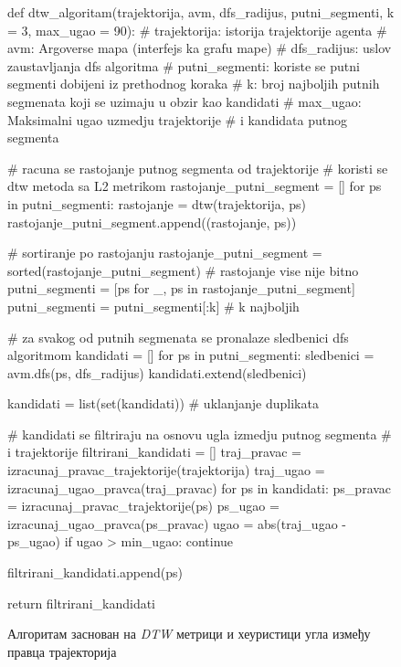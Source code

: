 \documentclass[11pt,oneside]{memoir}
\begin{document}
\begin{figure}
  \begin{python}
  def dtw_algoritam(trajektorija, avm, dfs_radijus, putni_segmenti, 
      k = 3, max_ugao = 90):
    # trajektorija: istorija trajektorije agenta 
    # avm: Argoverse mapa (interfejs ka grafu mape)
    # dfs_radijus: uslov zaustavljanja dfs algoritma
    # putni_segmenti: koriste se putni segmenti dobijeni iz prethodnog koraka
    # k: broj najboljih putnih segmenata koji se uzimaju u obzir kao kandidati
    # max_ugao: Maksimalni ugao uzmedju trajektorije 
    #           i kandidata putnog segmenta
    
    # racuna se rastojanje putnog segmenta od trajektorije
    # koristi se dtw metoda sa L2 metrikom
    rastojanje_putni_segment = []
    for ps in putni_segmenti:
      rastojanje = dtw(trajektorija, ps)
      rastojanje_putni_segment.append((rastojanje, ps))

    # sortiranje po rastojanju
    rastojanje_putni_segment = sorted(rastojanje_putni_segment)
    # rastojanje vise nije bitno
    putni_segmenti = [ps for _, ps in rastojanje_putni_segment]
    putni_segmenti = putni_segmenti[:k]  # k najboljih

    # za svakog od putnih segmenata se pronalaze sledbenici dfs algoritmom
    kandidati = []
    for ps in putni_segmenti:
      sledbenici = avm.dfs(ps, dfs_radijus)
      kandidati.extend(sledbenici)

    kandidati = list(set(kandidati))  # uklanjanje duplikata

    # kandidati se filtriraju na osnovu ugla izmedju putnog segmenta
    # i trajektorije
    filtrirani_kandidati = []
    traj_pravac = izracunaj_pravac_trajektorije(trajektorija)
    traj_ugao = izracunaj_ugao_pravca(traj_pravac)
    for ps in kandidati:
      ps_pravac = izracunaj_pravac_trajektorije(ps)
      ps_ugao = izracunaj_ugao_pravca(ps_pravac)
      ugao = abs(traj_ugao - ps_ugao)
      if ugao > min_ugao:
        continue
      
      filtrirani_kandidati.append(ps)

    return filtrirani_kandidati

  \end{python}
  \caption{Алгоритам заснован на \textit{DTW} метрици и хеуристици угла између правца трајекторија \label{dtw-algorithm}}
  \end{figure}
\end{document}
